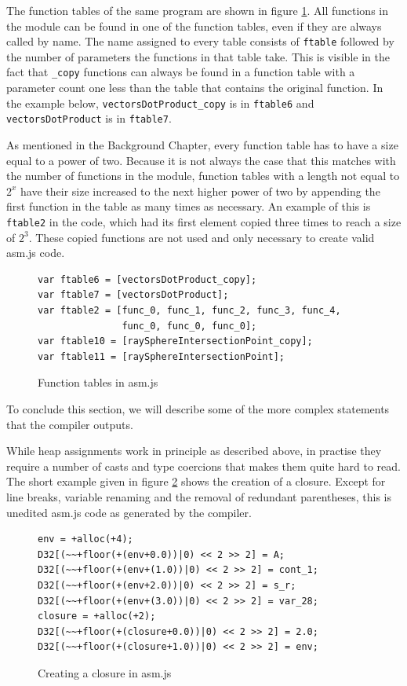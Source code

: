 \documentclass[11pt]{report}
\begin{document}
The function tables of the same program are shown in figure \ref{iasmjsmm6}. All functions in the module can be found in one of the function tables, even if they are always called by name. The name assigned to every table consists of \texttt{ftable} followed by the number of parameters the functions in that table take. This is visible in the fact that \texttt{_copy} functions can always be found in a function table with a parameter count one less than the table that contains the original function. In the example below, \texttt{vectorsDotProduct_copy} is in \texttt{ftable6} and \texttt{vectorsDotProduct} is in \texttt{ftable7}.

As mentioned in the Background Chapter, every function table has to have a size equal to a power of two. Because it is not always the case that this matches with the number of functions in the module, function tables with a length not equal to $2^x$ have their size increased to the next higher power of two by appending the first function in the table as many times as necessary. An example of this is \texttt{ftable2} in the code, which had its first element copied three times to reach a size of $2^3$. These copied functions are not used and only necessary to create valid asm.js code.

\begin{figure}[t]
\begin{lstlisting}
var ftable6 = [vectorsDotProduct_copy];
var ftable7 = [vectorsDotProduct];
var ftable2 = [func_0, func_1, func_2, func_3, func_4,
               func_0, func_0, func_0];
var ftable10 = [raySphereIntersectionPoint_copy];
var ftable11 = [raySphereIntersectionPoint];
\end{lstlisting}
\caption{Function tables in asm.js}
\label{iasmjsmm6}
\end{figure}

To conclude this section, we will describe some of the more complex statements that the compiler outputs.

While heap assignments work in principle as described above, in practise they require a number of casts and type coercions that makes them quite hard to read. The short example given in figure \ref{iasmjsmm7} shows the creation of a closure. Except for line breaks, variable renaming and the removal of redundant parentheses, this is unedited asm.js code as generated by the compiler.

\begin{figure}[ht]
\begin{lstlisting}
env = +alloc(+4);
D32[(~~+floor(+(env+0.0))|0) << 2 >> 2] = A;
D32[(~~+floor(+(env+(1.0))|0) << 2 >> 2] = cont_1;
D32[(~~+floor(+(env+2.0))|0) << 2 >> 2] = s_r;
D32[(~~+floor(+(env+(3.0))|0) << 2 >> 2] = var_28;
closure = +alloc(+2);
D32[(~~+floor(+(closure+0.0))|0) << 2 >> 2] = 2.0;
D32[(~~+floor(+(closure+1.0))|0) << 2 >> 2] = env;
\end{lstlisting}
\caption{Creating a closure in asm.js}
\label{iasmjsmm7}
\end{figure}
\end{document}
